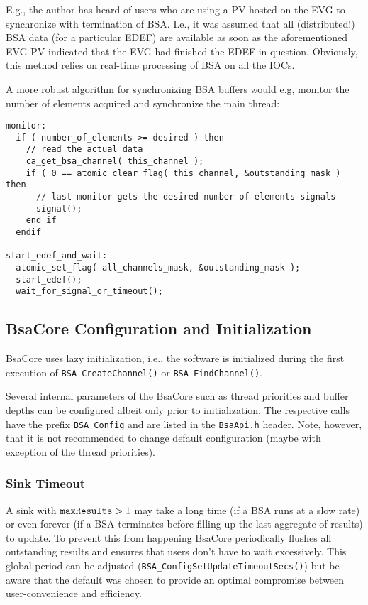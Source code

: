 \documentclass[11pt]{article}
\newcommand{\bsac}{BsaCore}
\newcommand{\bsa} {BSA}
\newcommand{\EDEF}{EDEF}
\newcommand{\cod}[1]{{\tt#1}}
\begin{document}
E.g., the author has heard of users who are using a PV hosted on the EVG
to synchronize with termination of \bsa{}. I.e., it was assumed that
all (distributed!) \bsa{} data (for a particular \EDEF{}) are available
as soon as the aforementioned EVG PV indicated that the EVG had finished the
\EDEF{} in question. Obviously, this method relies on real-time 
processing of \bsa{} on all the IOCs.

A more robust algorithm for synchronizing \bsa{} buffers would
e.g, monitor the number of elements acquired and synchronize
the main thread:
\begin{lstlisting}
monitor:
  if ( number_of_elements >= desired ) then
    // read the actual data
    ca_get_bsa_channel( this_channel );
    if ( 0 == atomic_clear_flag( this_channel, &outstanding_mask ) then
      // last monitor gets the desired number of elements signals
      signal();
    end if
  endif

start_edef_and_wait:
  atomic_set_flag( all_channels_mask, &outstanding_mask );
  start_edef();
  wait_for_signal_or_timeout();
\end{lstlisting}

\subsection{\bsac{} Configuration and Initialization}
\bsac{} uses lazy initialization, i.e., the software is initialized
during the first execution of
\cod{BSA\_CreateChannel()} or \cod{BSA\_FindChannel()}.

Several internal parameters of the \bsac{} such as thread priorities
and buffer depths can be configured albeit only prior to initialization.
The respective calls have the prefix \cod{BSA\_Config} and are listed
in the \cod{BsaApi.h} header. Note, however, that it is not recommended
to change default configuration (maybe with exception of the thread
priorities).

\subsubsection{Sink Timeout}
A sink with $\cod{maxResults} >1$ may take a long time (if a \bsa{} runs
at a slow rate) or even forever (if a \bsa{} terminates before filling up
the last aggregate of results) to update. To prevent this from happening
\bsac{} periodically flushes all outstanding results and ensures that
users don't have to wait excessively. This global period can be adjusted
(\cod{BSA\_ConfigSetUpdateTimeoutSecs()}) but be aware that the default was
chosen to provide an optimal compromise between user-convenience and efficiency.
\appendix
\pagebreak
\end{document}
